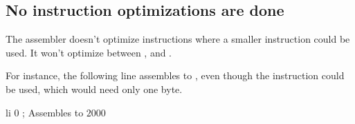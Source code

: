 \subsection{No instruction optimizations are done}


The assembler doesn't optimize instructions where a smaller
instruction could be used. It won't optimize between
,  and .

For instance, the following line assembles to , even
though the  instruction could be used, which would need
only one byte.

\begin{code}
        li      0       ; Assembles to $20 $00
\end{code}
